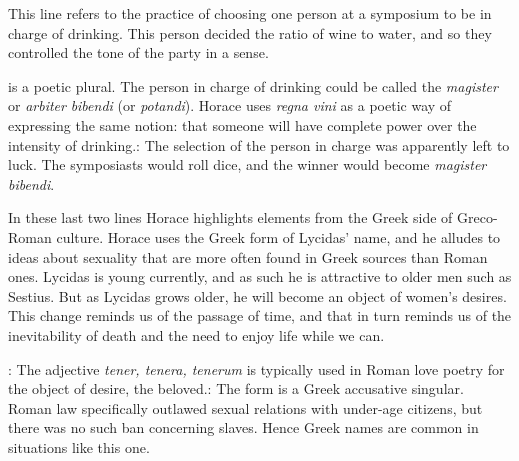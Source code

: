 
This line refers to the practice of choosing one person at a symposium to be in charge of drinking.  This person decided the ratio of wine to water, and so they controlled the tone of the party in a sense. 

 is a poetic plural.  The person in charge of drinking could be called the \textit{magister} or \textit{arbiter} \textit{bibendi} (or \textit{potandi}).  Horace uses \textit{regna vini} as a poetic way of expressing the same notion: that someone will have complete power over the intensity of drinking.\indent{}: The selection of the person in charge was apparently left to luck.  The symposiasts would roll dice, and the winner would become \textit{magister bibendi}.


In these last two lines Horace highlights elements from the Greek side of Greco-Roman culture.  Horace uses the Greek form of Lycidas' name, and he alludes to ideas about sexuality that are more often found in Greek sources than Roman ones.  Lycidas is young currently, and as such he is attractive to older men such as Sestius.  But as Lycidas grows older, he will become an object of women's desires.  This change reminds us of the passage of time, and that in turn reminds us of the inevitability of death and the need to enjoy life while we can.

: The adjective \textit{tener, tenera, tenerum} is typically used in Roman love poetry for the object of desire, the beloved.\indent{}: The form is a Greek accusative singular.  Roman law specifically outlawed sexual relations with under-age citizens, but there was no such ban concerning slaves.  Hence Greek names are common in situations like this one.
